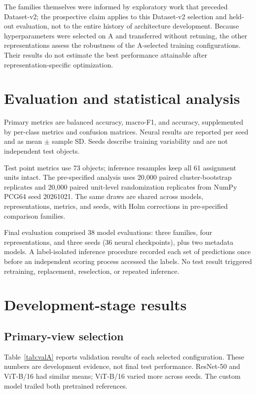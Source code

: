 \documentclass[preprint,12pt,authoryear]{elsarticle}
\newcommand{\balacc}{balanced accuracy}
\newcommand{\macrof}{macro-F1}
\begin{document}
The families themselves were informed by exploratory work that preceded Dataset-v2;
the prospective claim applies to this Dataset-v2 selection and held-out evaluation,
not to the entire history of architecture development. Because hyperparameters were
selected on A and transferred without retuning, the other representations assess the
robustness of the A-selected training configurations. Their results do not estimate
the best performance attainable after representation-specific optimization.

\section{Evaluation and statistical analysis}

Primary metrics are \balacc{}, \macrof{}, and accuracy, supplemented by per-class
metrics and confusion matrices. Neural results are reported per seed and as mean
$\pm$ sample SD. Seeds describe training variability and are not independent test
objects.

Test point metrics use 73 objects; inference resamples keep all 61 assignment units
intact. The pre-specified analysis uses 20,000 paired cluster-bootstrap replicates and
20,000 paired unit-level randomization replicates from NumPy PCG64 seed 20261021.
The same draws are shared across models, representations, metrics, and seeds, with
Holm corrections in pre-specified comparison families.

Final evaluation comprised 38 model evaluations: three families, four representations,
and three seeds (36 neural checkpoints), plus two metadata models. A label-isolated
inference procedure recorded each set of predictions once before an independent
scoring process accessed the labels. No test result triggered retraining, replacement,
reselection, or repeated inference.

\section{Development-stage results}

\subsection{Primary-view selection}

Table~\ref{tab:valA} reports validation results of each selected configuration. These
numbers are development evidence, not final test performance. ResNet-50 and ViT-B/16
had similar means; ViT-B/16 varied more across seeds. The custom model trailed both
pretrained references.
\end{document}
